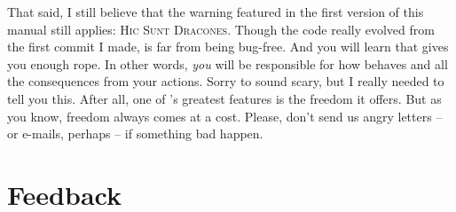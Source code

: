 \documentclass[a4paper,twoside,12pt]{memoir}
\begin{document}
%
That said, I still believe that the warning featured in the first version of this manual still applies: \textsc{Hic Sunt Dracones}. Though the code really evolved from the first commit I made, \arara is far from being bug-free. And you will learn that \arara gives you enough rope. In other words, \emph{you} will be responsible for how \arara behaves and all the consequences from your actions. Sorry to sound scary, but I really needed to tell you this. After all, one of \arara's greatest features is the freedom it offers. But as you know, freedom always comes at a cost. Please, don't send us angry letters -- or e-mails, perhaps -- if something bad happen.

\section{Feedback}
\end{document}
